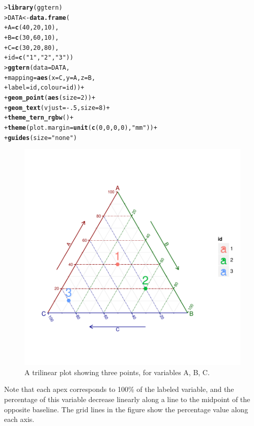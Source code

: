 \documentclass[10pt,krantz2]{krantz}\usepackage[]{graphicx}\usepackage[]{color}
\makeatletter
\newcommand{\hlnum}[1]{\textcolor[rgb]{0.686,0.059,0.569}{#1}}%
\newcommand{\hlstr}[1]{\textcolor[rgb]{0.192,0.494,0.8}{#1}}%
\newcommand{\hlopt}[1]{\textcolor[rgb]{0,0,0}{#1}}%
\newcommand{\hlstd}[1]{\textcolor[rgb]{0.345,0.345,0.345}{#1}}%
\newcommand{\hlkwb}[1]{\textcolor[rgb]{0.69,0.353,0.396}{#1}}%
\newcommand{\hlkwc}[1]{\textcolor[rgb]{0.333,0.667,0.333}{#1}}%
\newcommand{\hlkwd}[1]{\textcolor[rgb]{0.737,0.353,0.396}{\textbf{#1}}}%
\newenvironment{kframe}{%
 \def\at@end@of@kframe{}%
 \ifinner\ifhmode%
  \def\at@end@of@kframe{\end{minipage}}%
  \begin{minipage}{\columnwidth}%
 \fi\fi%
 \def\FrameCommand##1{\hskip\@totalleftmargin \hskip-\fboxsep
 \colorbox{shadecolor}{##1}\hskip-\fboxsep
     \hskip-\linewidth \hskip-\@totalleftmargin \hskip\columnwidth}%
 \MakeFramed {\advance\hsize-\width
   \@totalleftmargin\z@ \linewidth\hsize
   \@setminipage}}%
 {\par\unskip\endMakeFramed%
 \at@end@of@kframe}
\newenvironment{knitrout}{}{} %
\renewenvironment{knitrout}{\small\renewcommand{\baselinestretch}{.85}}{} %
\makeatother
\begin{document}
\begin{knitrout}
\color{fgcolor}\begin{kframe}
\begin{alltt}
\hlstd{> }\hlkwd{library}\hlstd{(ggtern)}
\hlstd{> }\hlstd{DATA} \hlkwb{<-} \hlkwd{data.frame}\hlstd{(}
\hlstd{+ }  \hlkwc{A} \hlstd{=} \hlkwd{c}\hlstd{(}\hlnum{40}\hlstd{,} \hlnum{20}\hlstd{,} \hlnum{10}\hlstd{),}
\hlstd{+ }  \hlkwc{B} \hlstd{=} \hlkwd{c}\hlstd{(}\hlnum{30}\hlstd{,} \hlnum{60}\hlstd{,} \hlnum{10}\hlstd{),}
\hlstd{+ }  \hlkwc{C} \hlstd{=} \hlkwd{c}\hlstd{(}\hlnum{30}\hlstd{,} \hlnum{20}\hlstd{,} \hlnum{80}\hlstd{),}
\hlstd{+ }  \hlkwc{id} \hlstd{=} \hlkwd{c}\hlstd{(}\hlstr{"1"}\hlstd{,} \hlstr{"2"}\hlstd{,} \hlstr{"3"}\hlstd{))}
\hlstd{> }\hlkwd{ggtern}\hlstd{(}\hlkwc{data} \hlstd{= DATA,}
\hlstd{+ }       \hlkwc{mapping} \hlstd{=} \hlkwd{aes}\hlstd{(}\hlkwc{x}\hlstd{=C,} \hlkwc{y}\hlstd{=A,} \hlkwc{z}\hlstd{=B,}
\hlstd{+ }                     \hlkwc{label}\hlstd{=id,} \hlkwc{colour}\hlstd{=id))} \hlopt{+}
\hlstd{+ }    \hlkwd{geom_point}\hlstd{(}\hlkwd{aes}\hlstd{(}\hlkwc{size}\hlstd{=}\hlnum{2}\hlstd{))} \hlopt{+}
\hlstd{+ }    \hlkwd{geom_text}\hlstd{(}\hlkwc{vjust}\hlstd{=}\hlopt{-}\hlnum{.5}\hlstd{,} \hlkwc{size}\hlstd{=}\hlnum{8}\hlstd{)} \hlopt{+}
\hlstd{+ }    \hlkwd{theme_tern_rgbw}\hlstd{()} \hlopt{+}
\hlstd{+ }    \hlkwd{theme}\hlstd{(}\hlkwc{plot.margin}\hlstd{=}\hlkwd{unit}\hlstd{(}\hlkwd{c}\hlstd{(}\hlnum{0}\hlstd{,}\hlnum{0}\hlstd{,}\hlnum{0}\hlstd{,}\hlnum{0}\hlstd{),}\hlstr{"mm"}\hlstd{))} \hlopt{+}
\hlstd{+ }    \hlkwd{guides}\hlstd{(}\hlkwc{size} \hlstd{=} \hlstr{"none"}\hlstd{)}
\end{alltt}
\end{kframe}\begin{figure}[!htbp]

\centerline{\includegraphics[width=.6\textwidth,trim=20 20 20 20,clip]{ch04/fig/tripdemo2-1} }

\caption[A trilinear plot showing three points, for variables A, B, C]{A trilinear plot showing three points, for variables A, B, C.\label{fig:tripdemo2}}
\end{figure}


\end{knitrout}
Note that each apex corresponds to 100\% of the labeled
variable, and the percentage of this variable decrease
linearly along a line to the midpoint of the opposite
baseline.
The grid lines in the figure show the percentage value along
each axis.
\end{document}
